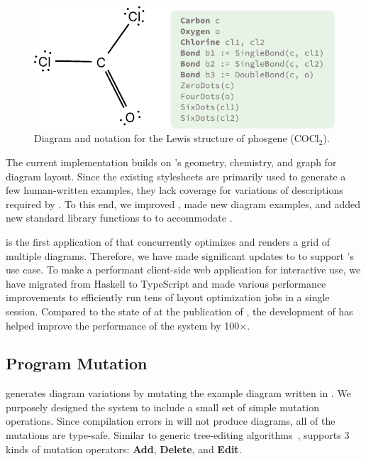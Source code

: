 \begin{figure}[H]
    \centering
    \includegraphics[width=.6\linewidth]{assets/edgeworth/cocl2-example.pdf}
    \caption{\textmd{Diagram and \Substance notation for the Lewis structure of phosgene (\ensuremath{\mathrm{COCl_2}}).}}
    \label{fig:cocl2-example}
\end{figure}

The current \Edgeworth implementation builds on \Penrose's geometry, chemistry, and graph \Style for diagram layout. Since the existing \Style stylesheets are primarily used to generate a few human-written examples, they lack coverage for variations of \Substance descriptions required by \Edgeworth. To this end, we improved \Style, made new diagram examples, and added new standard library functions to \Penrose to accommodate \Edgeworth.

\Edgeworth is the first application of \Penrose that concurrently optimizes and renders a grid of multiple diagrams. Therefore, we have made significant updates to \Penrose to support \Edgeworth's use case. To make \Edgeworth a performant client-side web application for interactive use, we have migrated from Haskell to TypeScript and made various performance improvements to efficiently run tens of layout optimization jobs in a single session. Compared to the state of \Penrose at the publication of \citet{penrose}, the development of \Edgeworth has helped improve the performance of the system by 100$\times$.


\subsection{Program Mutation}
\label{sec:edgeworth-mutation}

\Edgeworth generates diagram variations by mutating the example diagram written in \Substance. 
We purposely designed the system to include a small set of simple mutation operations. Since compilation errors in \Substance will not produce diagrams, all of the mutations are type-safe. Similar to generic tree-editing algorithms~\cite{gumtree}, \Edgeworth supports 3 kinds of mutation operators: \textbf{Add}, \textbf{Delete}, and \textbf{Edit}. 


